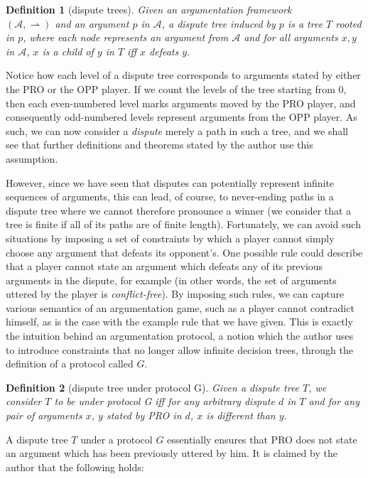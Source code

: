 \documentclass[12pt, a4paper]{article}
\newcommand{\df}{\ensuremath{\rightharpoonup}}
\newtheorem{Def}{Definition}[subsection]
\begin{document}
\begin{Def}[dispute trees]
	Given an argumentation framework\\ $(\mathcal{A}, \df)$ and an argument $p$ in $\mathcal{A}$, a dispute tree induced by $p$ is a tree $T$ rooted in $p$, where each node represents an argument from $\mathcal{A}$ and for all arguments $x, y$ in $\mathcal{A}$, $x$ is a child of $y$ in $T$ iff $x$ defeats $y$.
\end{Def}

Notice how each level of a dispute tree corresponds to arguments stated by either the PRO or the OPP player. If we count the levels of the tree starting from 0, then each even-numbered level marks arguments moved by the PRO player, and consequently odd-numbered levels represent arguments from the OPP player. As such, we can now consider a \emph{dispute} merely a path in such a tree, and we shall see that further definitions and theorems stated by the author use this assumption.


However, since we have seen that disputes can potentially represent infinite sequences of arguments, this can lead, of course, to never-ending paths in a dispute tree where we cannot therefore pronounce a winner (we consider that a tree is finite if all of its paths are of finite length). Fortunately, we can avoid such situations by imposing a set of constraints by which a player cannot simply choose any argument that defeats its opponent's. One possible rule could describe that a player cannot state an argument which defeats any of its previous arguments in the dispute, for example (in other words, the set of arguments uttered by the player is \emph{conflict-free}). By imposing such rules, we can capture various semantics of an argumentation game, such as a player cannot contradict himself, as is the case with the example rule that we have given. This is exactly the intuition behind an argumentation protocol, a notion which the author uses to introduce constraints that no longer allow infinite decision trees, through the definition of a protocol called $G$.

\begin{Def}[dispute tree under protocol G]\label{protG}
	Given a dispute tree $T$, we consider $T$ to be under protocol G iff for any arbitrary dispute $d$ in $T$ and for any pair of arguments $x$, $y$ stated by PRO in $d$, $x$ is different than $y$.
\end{Def}

A dispute tree $T$ under a protocol $G$ essentially ensures that PRO does not state an argument which has been previously uttered by him. It is claimed by the author that the following holds:
\end{document}
